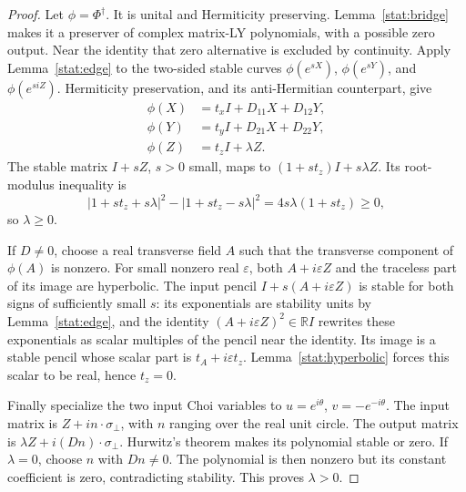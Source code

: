 \documentclass[reqno]{amsart}
\theoremstyle{definition}
\theoremstyle{remark}
\newcommand{\R}{\mathbb R}
\begin{document}
\begin{proof}
Let $\phi=\Phi^\dagger$.  It is unital and Hermiticity preserving.
Lemma~\ref{stat:bridge} makes it a preserver of complex matrix-LY
polynomials, with a possible zero output.  Near the identity that zero
alternative is excluded by continuity.  Apply
Lemma~\ref{stat:edge} to the two-sided stable curves
$\phi(e^{sX})$, $\phi(e^{sY})$, and $\phi(e^{siZ})$.
Hermiticity preservation, and its anti-Hermitian counterpart, give
\begin{equation}\label{loc:adjoint-block}
 \begin{aligned}
 \phi(X)&=t_xI+D_{11}X+D_{12}Y,\\
 \phi(Y)&=t_yI+D_{21}X+D_{22}Y,\\
 \phi(Z)&=t_zI+\lambda Z.
 \end{aligned}
\end{equation}
The stable matrix $I+sZ$, $s>0$ small, maps to
$(1+st_z)I+s\lambda Z$.  Its root-modulus inequality is
\[
 |1+st_z+s\lambda|^2-|1+st_z-s\lambda|^2
       =4s\lambda(1+st_z)\geq0,
\]
so $\lambda\geq0$.

If $D\ne0$, choose a real transverse field $A$ such that the transverse
component of $\phi(A)$ is nonzero.  For small nonzero real
$\varepsilon$, both $A+i\varepsilon Z$ and the traceless part of its
image are hyperbolic.  The input pencil
$I+s(A+i\varepsilon Z)$ is stable for both signs of sufficiently
small $s$: its exponentials are stability units by
Lemma~\ref{stat:edge}, and the identity
$(A+i\varepsilon Z)^2\in\R I$ rewrites these exponentials as scalar
multiples of the pencil near the identity.  Its image is a stable pencil
whose scalar part is $t_A+i\varepsilon t_z$.
Lemma~\ref{stat:hyperbolic} forces this scalar to be real, hence $t_z=0$.

Finally specialize the two input Choi variables to
$u=e^{i\theta}$, $v=-e^{-i\theta}$.  The input matrix is
$Z+i n\cdot\sigma_\perp$, with $n$ ranging over the real unit circle.
The output matrix is
$\lambda Z+i(Dn)\cdot\sigma_\perp$.  Hurwitz's theorem makes its
polynomial stable or zero.  If $\lambda=0$, choose $n$ with $Dn\ne0$.
The polynomial is then nonzero but its constant coefficient is zero,
contradicting stability.  This proves $\lambda>0$.
\end{proof}
\end{document}
